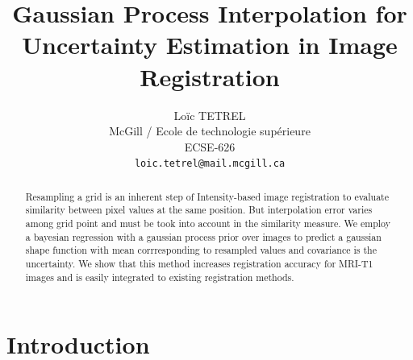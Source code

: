 \documentclass[10pt,twocolumn,letterpaper]{article}
\begin{document}
\title{Gaussian Process Interpolation for Uncertainty Estimation in Image Registration}

\author{Loïc TETREL\\
McGill / Ecole de technologie supérieure \\
ECSE-626\\
{\tt\small loic.tetrel@mail.mcgill.ca}
}

\maketitle

\begin{abstract}
Resampling a grid is an inherent step of Intensity-based image registration to evaluate similarity between pixel values at the same position.
But interpolation error varies among grid point and must be took into account in the similarity measure.
We employ a bayesian regression with a gaussian process prior over images to predict a gaussian shape function with mean corrresponding to resampled values and covariance is the uncertainty.
We show that this method increases registration accuracy for MRI-T1 images and is easily integrated to existing registration methods.
\end{abstract}

\section{Introduction}
\end{document}
